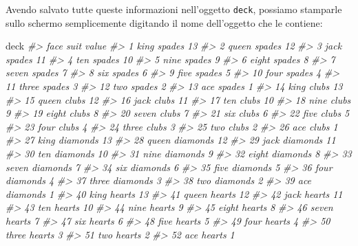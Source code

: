 \documentclass[
]{memoir}
\newenvironment{Shaded}{\begin{snugshade}}{\end{snugshade}}
\newcommand{\CommentTok}[1]{\textcolor[rgb]{0.56,0.35,0.01}{\textit{#1}}}
\newcommand{\NormalTok}[1]{#1}
\theoremstyle{definition}
\theoremstyle{definition}
\theoremstyle{definition}
\theoremstyle{definition}
\theoremstyle{remark}
\begin{document}
Avendo salvato tutte queste informazioni nell'oggetto \texttt{deck}, possiamo
stamparle sullo schermo semplicemente digitando il nome dell'oggetto che
le contiene:

\begin{Shaded}
\begin{Highlighting}[]
\NormalTok{deck}
\CommentTok{\#\textgreater{}     face     suit value}
\CommentTok{\#\textgreater{} 1   king   spades    13}
\CommentTok{\#\textgreater{} 2  queen   spades    12}
\CommentTok{\#\textgreater{} 3   jack   spades    11}
\CommentTok{\#\textgreater{} 4    ten   spades    10}
\CommentTok{\#\textgreater{} 5   nine   spades     9}
\CommentTok{\#\textgreater{} 6  eight   spades     8}
\CommentTok{\#\textgreater{} 7  seven   spades     7}
\CommentTok{\#\textgreater{} 8    six   spades     6}
\CommentTok{\#\textgreater{} 9   five   spades     5}
\CommentTok{\#\textgreater{} 10  four   spades     4}
\CommentTok{\#\textgreater{} 11 three   spades     3}
\CommentTok{\#\textgreater{} 12   two   spades     2}
\CommentTok{\#\textgreater{} 13   ace   spades     1}
\CommentTok{\#\textgreater{} 14  king    clubs    13}
\CommentTok{\#\textgreater{} 15 queen    clubs    12}
\CommentTok{\#\textgreater{} 16  jack    clubs    11}
\CommentTok{\#\textgreater{} 17   ten    clubs    10}
\CommentTok{\#\textgreater{} 18  nine    clubs     9}
\CommentTok{\#\textgreater{} 19 eight    clubs     8}
\CommentTok{\#\textgreater{} 20 seven    clubs     7}
\CommentTok{\#\textgreater{} 21   six    clubs     6}
\CommentTok{\#\textgreater{} 22  five    clubs     5}
\CommentTok{\#\textgreater{} 23  four    clubs     4}
\CommentTok{\#\textgreater{} 24 three    clubs     3}
\CommentTok{\#\textgreater{} 25   two    clubs     2}
\CommentTok{\#\textgreater{} 26   ace    clubs     1}
\CommentTok{\#\textgreater{} 27  king diamonds    13}
\CommentTok{\#\textgreater{} 28 queen diamonds    12}
\CommentTok{\#\textgreater{} 29  jack diamonds    11}
\CommentTok{\#\textgreater{} 30   ten diamonds    10}
\CommentTok{\#\textgreater{} 31  nine diamonds     9}
\CommentTok{\#\textgreater{} 32 eight diamonds     8}
\CommentTok{\#\textgreater{} 33 seven diamonds     7}
\CommentTok{\#\textgreater{} 34   six diamonds     6}
\CommentTok{\#\textgreater{} 35  five diamonds     5}
\CommentTok{\#\textgreater{} 36  four diamonds     4}
\CommentTok{\#\textgreater{} 37 three diamonds     3}
\CommentTok{\#\textgreater{} 38   two diamonds     2}
\CommentTok{\#\textgreater{} 39   ace diamonds     1}
\CommentTok{\#\textgreater{} 40  king   hearts    13}
\CommentTok{\#\textgreater{} 41 queen   hearts    12}
\CommentTok{\#\textgreater{} 42  jack   hearts    11}
\CommentTok{\#\textgreater{} 43   ten   hearts    10}
\CommentTok{\#\textgreater{} 44  nine   hearts     9}
\CommentTok{\#\textgreater{} 45 eight   hearts     8}
\CommentTok{\#\textgreater{} 46 seven   hearts     7}
\CommentTok{\#\textgreater{} 47   six   hearts     6}
\CommentTok{\#\textgreater{} 48  five   hearts     5}
\CommentTok{\#\textgreater{} 49  four   hearts     4}
\CommentTok{\#\textgreater{} 50 three   hearts     3}
\CommentTok{\#\textgreater{} 51   two   hearts     2}
\CommentTok{\#\textgreater{} 52   ace   hearts     1}
\end{Highlighting}
\end{Shaded}
\end{document}
